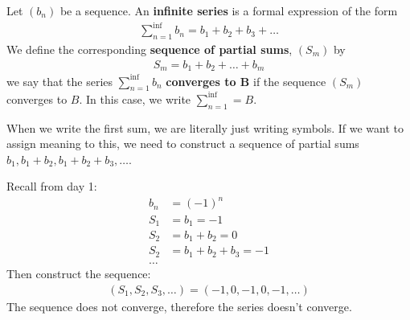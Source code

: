 \begin{definition}
	Let $\left( b_n \right) $ be a sequence. An \textbf{infinite series} is a formal expression of the form 
	\begin{align}
		\sum_{n=1}^{\inf } b_n = b_1 +b_2 + b_3 + \ldots
	\end{align}
	We define the corresponding \textbf{sequence of partial sums}, $\left( S_m \right) $ by
	\begin{align}
		S_m = b_1 + b_2 + \ldots + b_m
	\end{align}
	we say that the series $\sum_{n=1}^{\inf } b_n$ \textbf{converges to B} if the sequence $\left( S_m \right) $ converges to $B$. In this case, we write  $\sum_{n=1}^{\inf } = B$.
\end{definition}

\begin{note}
	When we write the first sum, we are literally just writing symbols. If we want to assign meaning to this, we need to construct a sequence of partial sums $b_1, b_1 + b_2, b_1 +b_2 +b_3, \ldots$.
\end{note}

\begin{eg}
	Recall from day 1:
	\begin{align}
		b_n &= \left( -1 \right)^{n} \\
		S_1 &= b_1 = -1 \\
		S_2 &= b_1 + b_2 = 0 \\
		S_2 &= b_1 + b_2 + b_3 = -1 \\
		\ldots
	\end{align}
	Then construct the sequence: 
	\begin{align}
		\left( S_1, S_2, S_3, \ldots \right) = \left(-1, 0, -1, 0, -1, \ldots  \right) 
	\end{align}
	The sequence does not converge, therefore the series doesn't converge.
\end{eg}

